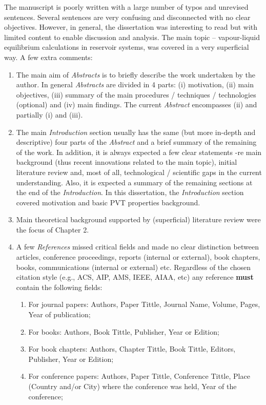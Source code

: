 \documentclass[14pt,twoside]{report}
\begin{document}
The manuscript is poorly written with a large number of typos and unrevised sentences. Several sentences are very confusing and disconnected with no clear objectives. However, in general, the dissertation was interesting to read but with limited content to enable discussion and analysis. The main topic -- vapour-liquid equilibrium calculations in reservoir systems, was covered in a very superficial way. A few extra comments:
\begin{enumerate}
\item The main aim of {\it Abstracts} is to briefly describe the work undertaken by the author. In general {\it Abstracts} are divided in 4 parts: (i) motivation, (ii) main objectives, (iii) summary of the main procedures / techniques / technologies (optional) and (iv) main findings. The current {\it Abstract} encompasses (ii) and partially (i) and (iii).
%
\item The main {\it Introduction} section usually has the same (but more in-depth and descriptive) four parts of the {\it Abstract} and a brief summary of the remaining of the work. In addition, it is always expected a few clear statements -re main background (thus recent innovations related to the main topic), initial literature review and, most of all, technological / scientific gaps in the current understanding. Also, it is expected a summary of the remaining sections at the end of the {\it Introduction}. In this dissertation, the {\it Introduction} section covered motivation and basic PVT properties background. 
%
\item Main theoretical background supported by (superficial) literature review were the focus of Chapter 2.  
%
\item A few {\it References} missed critical fields and made no clear distinction between articles, conference proceedings, reports (internal or external), book chapters, books, communications (internal or external) etc. Regardless of the chosen citation style (e.g., ACS, AIP, AMS, IEEE, AIAA, etc) any reference {\bf must} contain the following fields: 
\begin{enumerate}
\item For journal papers: Authors, Paper Tittle, Journal Name, Volume, Pages, Year of publication;
\item For books: Authors, Book Tittle, Publisher, Year or Edition;
\item For book chapters: Authors, Chapter Tittle, Book Tittle, Editors, Publisher, Year or Edition;
\item For conference papers: Authors, Paper Tittle, Conference Tittle, Place (Country and/or City) where the conference was held, Year of the conference;

\end{enumerate}
\end{enumerate}
\end{document}
